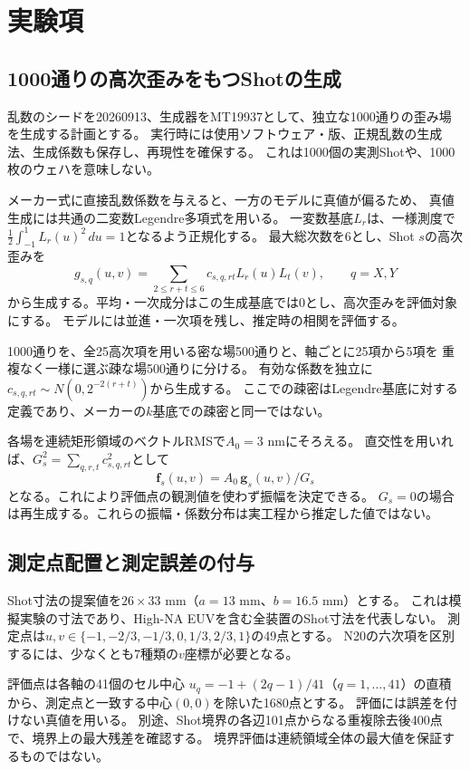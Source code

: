 \documentclass[11pt,a4paper]{ltjsarticle}
\begin{document}
\section{実験項}
\subsection{1000通りの高次歪みをもつShotの生成}
乱数のシードを20260913、生成器をMT19937として、独立な1000通りの歪み場を生成する計画とする。
実行時には使用ソフトウェア・版、正規乱数の生成法、生成係数も保存し、再現性を確保する。
これは1000個の実測Shotや、1000枚のウェハを意味しない。

メーカー式に直接乱数係数を与えると、一方のモデルに真値が偏るため、
真値生成には共通の二変数Legendre多項式を用いる。
一変数基底$L_r$は、一様測度で$\frac12\int_{-1}^{1}L_r(u)^2\,du=1$となるよう正規化する。
最大総次数を6とし、Shot $s$の高次歪みを
\begin{equation}
 g_{s,q}(u,v)=\sum_{2\leq r+t\leq 6}
 c_{s,q,rt}L_r(u)L_t(v),\qquad q=X,Y
 \label{eq:truth}
\end{equation}
から生成する。平均・一次成分はこの生成基底では0とし、高次歪みを評価対象にする。
モデルには並進・一次項を残し、推定時の相関を評価する。

1000通りを、全25高次項を用いる密な場500通りと、軸ごとに25項から5項を
重複なく一様に選ぶ疎な場500通りに分ける。
有効な係数を独立に$c_{s,q,rt}\sim N(0,2^{-2(r+t)})$から生成する。
ここでの疎密はLegendre基底に対する定義であり、メーカーの$k$基底での疎密と同一ではない。

各場を連続矩形領域のベクトルRMSで$A_0=3$ nmにそろえる。
直交性を用いれば、$G_s^2=\sum_{q,r,t}c_{s,q,rt}^2$として
\begin{equation}
 \bm f_s(u,v)=A_0\,\bm g_s(u,v)/G_s
 \label{eq:amplitude}
\end{equation}
となる。これにより評価点の観測値を使わず振幅を決定できる。
$G_s=0$の場合は再生成する。これらの振幅・係数分布は実工程から推定した値ではない。

\subsection{測定点配置と測定誤差の付与}
Shot寸法の提案値を$26\times33$ mm（$a=13$ mm、$b=16.5$ mm）とする。
これは模擬実験の寸法であり、High-NA EUVを含む全装置のShot寸法を代表しない。
測定点は$u,v\in\{-1,-2/3,-1/3,0,1/3,2/3,1\}$の49点とする。
N20の六次項を区別するには、少なくとも7種類の$v$座標が必要となる。

評価点は各軸の41個のセル中心
$u_q=-1+(2q-1)/41$（$q=1,\ldots,41$）の直積から、測定点と一致する中心$(0,0)$を除いた1680点とする。
評価には誤差を付けない真値を用いる。
別途、Shot境界の各辺101点からなる重複除去後400点で、境界上の最大残差を確認する。
境界評価は連続領域全体の最大値を保証するものではない。
\end{document}

